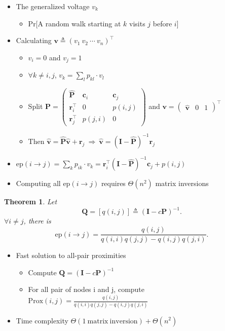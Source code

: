 \documentclass{article}
\newtheorem*{mythm*}{Theorem}
\begin{document}
\begin{itemize}
\item The generalized voltage $v_k$
\begin{itemize}
\item Pr[A random walk starting at $k$ visits $j$ before $i$]
\end{itemize}
\item Calculating $\bm{v} \triangleq (v_1\ v_2\ \cdots\ v_n)^\top$
\begin{itemize}
\item $v_i = 0$ and $v_j = 1$
\item $\forall k\neq i, j$, $v_k = \sum\limits_l p_{kl} \cdot v_l$
\item Split
$\bm{P} = \begin{pmatrix}
\hat{\bm{P}} & \bm{c}_i & \bm{c}_j \\
\bm{r}_i^\top & 0 & p(i,j) \\
\bm{r}_j^\top & p(j,i) & 0
\end{pmatrix}$
and $\bm{v} = \begin{pmatrix} \hat{\bm{v}} & 0 & 1 \end{pmatrix}^\top$
\item Then $\hat{\bm{v}} = \hat{\bm{P}} \hat{\bm{v}} + \bm{r}_j \ \Rightarrow\ \hat{\bm{v}} = (\bm{I} - \hat{\bm{P}})^{-1} \bm{r}_j$
\end{itemize}
\item $\mathrm{ep}(i\rightarrow j) = \sum\limits_k p_{ik} \cdot v_k = \bm{r}_i^\top (\bm{I} - \hat{\bm{P}})^{-1} \bm{c}_j + p(i,j)$
\item Computing all $\mathrm{ep}(i\rightarrow j)$ requires $\Theta(n^2)$ matrix inversions
\end{itemize}

\begin{mythm*}
Let
\[
\bm{Q} = \left[ q(i,j) \right] \triangleq (\bm{I} - c\bm{P})^{-1}.
\]
$\forall i\neq j$, there is
\[
\mathrm{ep}(i\rightarrow j) = \frac{q(i,j)}{q(i,i)q(j,j) - q(i,j)q(j,i)}.
\]
\end{mythm*}

\begin{itemize}
\item Fast solution to all-pair proximities
\begin{itemize}
\item Compute $\bm{Q} = (\bm{I} - c\bm{P})^{-1}$
\item For all pair of nodes i and j, compute $\mathrm{Prox}(i,j) = \frac{q(i,j)}{q(i,i)q(j,j) - q(i,j)q(j,i)}$
\end{itemize}
\item Time complexity $\Theta(\mathrm{1\ matrix\ inversion}) + \Theta(n^2)$
\end{itemize}
\end{document}
